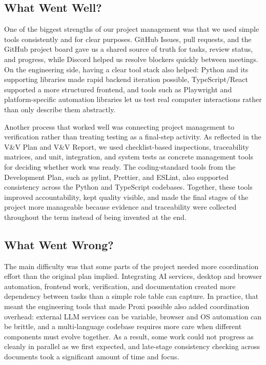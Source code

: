 \documentclass{article}
\begin{document}
\subsection{What Went Well?}

One of the biggest strengths of our project management was that we used
simple tools consistently and for clear purposes. GitHub Issues, pull
requests, and the GitHub project board gave us a shared source of truth
for tasks, review status, and progress, while Discord helped us resolve
blockers quickly between meetings. On the engineering side, having a
clear tool stack also helped: Python and its supporting libraries made
rapid backend iteration possible, TypeScript/React supported a more
structured frontend, and tools such as Playwright and platform-specific
automation libraries let us test real computer interactions rather than
only describe them abstractly.

Another process that worked well was connecting project management to
verification rather than treating testing as a final-step activity. As
reflected in the V\&V Plan and V\&V Report, we used checklist-based
inspections, traceability matrices, and unit, integration, and system
tests as concrete management tools for deciding whether work was ready.
The coding-standard tools from the Development Plan, such as pylint,
Prettier, and ESLint, also supported consistency across the Python and
TypeScript codebases. Together, these tools improved accountability,
kept quality visible, and made the final stages of the project more
manageable because evidence and traceability were collected throughout
the term instead of being invented at the end.

\subsection{What Went Wrong?}

The main difficulty was that some parts of the project needed more
coordination effort than the original plan implied. Integrating AI
services, desktop and browser automation, frontend work, verification,
and documentation created more dependency between tasks than a simple
role table can capture. In practice, that meant the engineering tools
that made Proxi possible also added coordination overhead: external LLM
services can be variable, browser and OS automation can be brittle, and
a multi-language codebase requires more care when different components
must evolve together. As a result, some work could not progress as
cleanly in parallel as we first expected, and late-stage consistency
checking across documents took a significant amount of time and focus.
\end{document}
